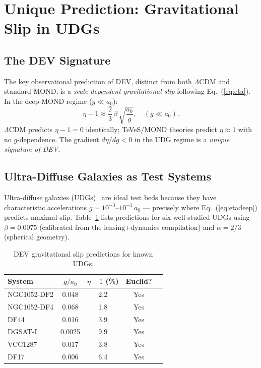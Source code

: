\documentclass[aps,prd,twocolumn,showpacs,superscriptaddress]{revtex4-2}
\newcommand{\aO}{a_0}
\newcommand{\LCDM}{$\Lambda$CDM}
\begin{document}
\section{Unique Prediction: Gravitational Slip in UDGs}
\label{sec:udg}

\subsection{The DEV Signature}

The key observational prediction of DEV, distinct from both
\LCDM{} and standard MOND, is a \emph{scale-dependent gravitational slip}
following Eq.~(\ref{eq:eta}).
In the deep-MOND regime ($g \ll \aO$):
\begin{equation}
  \eta - 1 \approx \frac{2}{3}\,\beta\,\sqrt{\frac{\aO}{g}},
  \quad (g \ll \aO).
  \label{eq:etadeep}
\end{equation}
\LCDM{} predicts $\eta - 1 = 0$ identically;
TeVeS/MOND theories predict $\eta \approx 1$ with no $g$-dependence.
The gradient $d\eta/dg < 0$ in the UDG regime is a
\emph{unique signature of DEV}.

\subsection{Ultra-Diffuse Galaxies as Test Systems}

Ultra-diffuse galaxies (UDGs)~\cite{vanDokkum2015} are ideal test beds
because they have characteristic accelerations
$g \sim 10^{-3}$--$10^{-1}\,\aO$ —
precisely where Eq.~(\ref{eq:etadeep}) predicts maximal slip.
Table~\ref{tab:udg} lists predictions for six well-studied UDGs using
$\beta = 0.0075$ (calibrated from the lensing+dynamics compilation)
and $\alpha = 2/3$ (spherical geometry).

\begin{table}[h]
\caption{DEV gravitational slip predictions for known UDGs.}
\label{tab:udg}
\begin{ruledtabular}
\begin{tabular}{lcccc}
System & $g/\aO$ & $\eta-1$ (\%) & Euclid? \\
\hline
NGC1052-DF2 & 0.048 & 2.2 & Yes \\
NGC1052-DF4 & 0.068 & 1.8 & Yes \\
DF44        & 0.016 & 3.9 & Yes \\
DGSAT-I     & 0.0025 & 9.9 & Yes \\
VCC1287     & 0.017  & 3.8 & Yes \\
DF17        & 0.006  & 6.4 & Yes \\
\end{tabular}
\end{ruledtabular}
\end{table}
\end{document}
